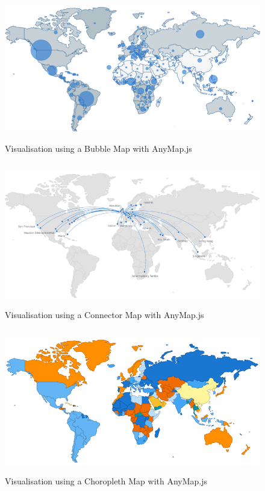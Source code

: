 \documentclass[11pt,a4paper]{article}
\begin{document}
\begin{figure}[H]
	\centering
	\includegraphics[height=6.3cm,keepaspectratio]{figures/fig4.png}
	\caption{\label{fig:4}Visualisation using a Bubble Map with AnyMap.js \parencite{AnyChart2017a}}
\end{figure}

\begin{figure}[H]
	\centering
	\includegraphics[height=6.3cm,keepaspectratio]{figures/fig6.png}
	\caption{\label{fig:6}Visualisation using a Connector Map with AnyMap.js \parencite{AnyChart2017}}
\end{figure}

\begin{figure}[H]
	\centering
	\includegraphics[height=6.3cm,keepaspectratio]{figures/fig5.png}
	\caption{\label{fig:5}Visualisation using a Choropleth Map with AnyMap.js  \parencite{AnyChart2017b}}
\end{figure}
\end{document}

